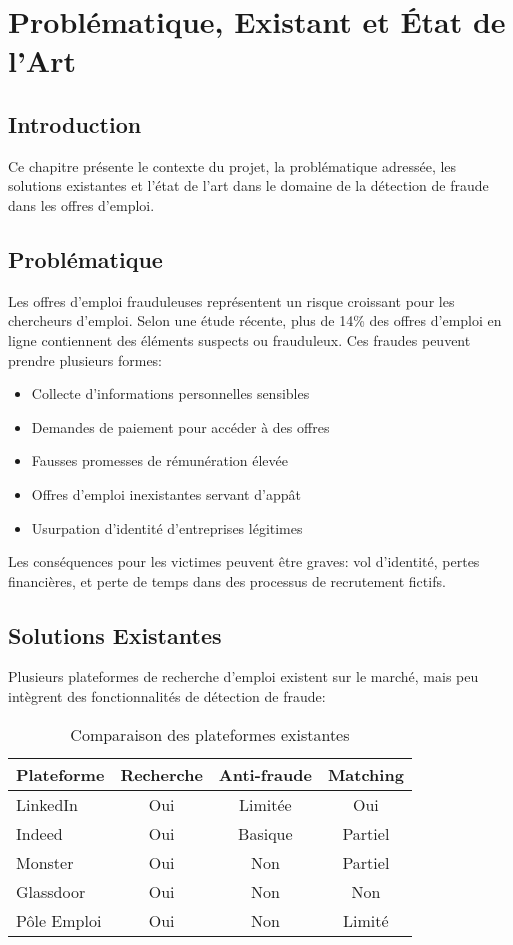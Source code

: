 \documentclass[10pt,a4paper,twocolumn]{article}
\begin{document}
\section{Problématique, Existant et État de l'Art}
\subsection{Introduction}
Ce chapitre présente le contexte du projet, la problématique adressée, les solutions existantes et l'état de l'art dans le domaine de la détection de fraude dans les offres d'emploi.

\subsection{Problématique}
Les offres d'emploi frauduleuses représentent un risque croissant pour les chercheurs d'emploi. Selon une étude récente, plus de 14\% des offres d'emploi en ligne contiennent des éléments suspects ou frauduleux. Ces fraudes peuvent prendre plusieurs formes:
\begin{itemize}
    \item Collecte d'informations personnelles sensibles
    \item Demandes de paiement pour accéder à des offres
    \item Fausses promesses de rémunération élevée
    \item Offres d'emploi inexistantes servant d'appât
    \item Usurpation d'identité d'entreprises légitimes
\end{itemize}

Les conséquences pour les victimes peuvent être graves: vol d'identité, pertes financières, et perte de temps dans des processus de recrutement fictifs.

\subsection{Solutions Existantes}
Plusieurs plateformes de recherche d'emploi existent sur le marché, mais peu intègrent des fonctionnalités de détection de fraude:

\begin{table}[H]
\centering
\scriptsize %
\begin{tabular}{|l|c|c|c|}
\hline
\textbf{Plateforme} & \textbf{Recherche} & \textbf{Anti-fraude} & \textbf{Matching} \\
\hline
LinkedIn & Oui & Limitée & Oui \\
Indeed & Oui & Basique & Partiel \\
Monster & Oui & Non & Partiel \\
Glassdoor & Oui & Non & Non \\
Pôle Emploi & Oui & Non & Limité \\
\hline
\end{tabular}
\caption{Comparaison des plateformes existantes}
\end{table}
\end{document}
